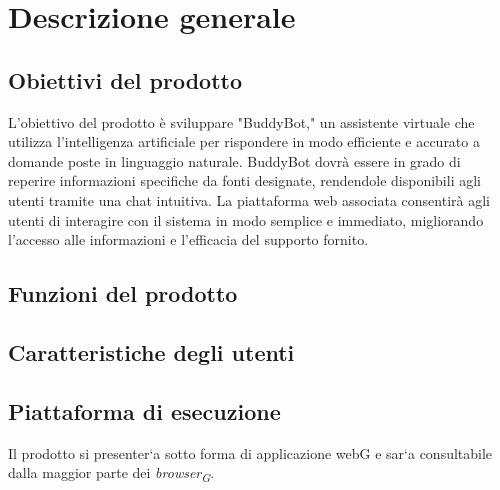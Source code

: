 

\section{Descrizione generale}

\subsection{Obiettivi del prodotto}
L'obiettivo del prodotto è sviluppare "BuddyBot," un assistente virtuale che utilizza l'intelligenza artificiale 
per rispondere in modo efficiente e accurato a domande poste in linguaggio naturale. BuddyBot dovrà essere in grado 
di reperire informazioni specifiche da fonti designate, rendendole disponibili agli utenti tramite una chat intuitiva. 
La piattaforma web associata consentirà agli utenti di interagire con il sistema in modo semplice e immediato, migliorando
l'accesso alle informazioni e l'efficacia del supporto fornito.

\subsection{Funzioni del prodotto}


\subsection{Caratteristiche degli utenti}
\subsection{Piattaforma di esecuzione}
Il prodotto si presenter`a sotto forma di applicazione webG e sar`a consultabile dalla maggior
parte dei \textit{browser\textsubscript{G}}.